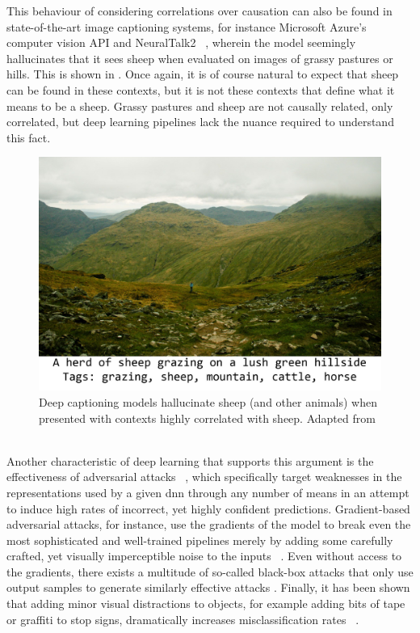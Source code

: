 	This behaviour of considering correlations over causation can also be found in state-of-the-art image captioning systems, for instance Microsoft Azure's computer vision API and NeuralTalk2 ~\cite{electric_sheep}, wherein the model seemingly hallucinates that it sees sheep when evaluated on images of grassy pastures or hills. This is shown in . Once again, it is of course natural to expect that sheep can be found in these contexts, but it is not these contexts that define what it means to be a sheep. Grassy pastures and sheep are not causally related, only correlated, but deep learning pipelines lack the nuance required to understand this fact. 
	\begin{figure}[ht]
		\includegraphics[width=\linewidth]{illustrations/sheep.jpg}
		\caption[Deep Hallucination]{Deep captioning models hallucinate sheep (and other animals) when presented with contexts highly correlated with sheep. Adapted from ~\cite{electric_sheep}}
		\label{sheep}
	\end{figure}

	Another characteristic of deep learning that supports this argument is the effectiveness of adversarial attacks ~\cite{adversarial_bugs_features}, which specifically target weaknesses in the representations used by a given \gls{dnn} through any number of means in an attempt to induce high rates of incorrect, yet highly confident predictions. Gradient-based adversarial attacks, for instance, use the gradients of the model to break even the most sophisticated and well-trained pipelines merely by adding some carefully crafted, yet visually imperceptible noise to the inputs ~\cite{adversarial_attacks}. Even without access to the gradients, there exists a multitude of so-called black-box attacks that only use output samples to generate similarly effective attacks \cite{blackbox_adv}. Finally, it has been shown that adding minor visual distractions to objects, for example adding bits of tape or graffiti to stop signs, dramatically increases misclassification rates ~\cite{physical_attacks}. 
	
